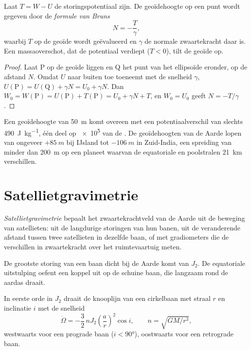\begin{proposition}\label{prop:b3:gravity-geodesy:bruns}
Laat $T = W - U$ de storingspotentiaal zijn. De geoïdehoogte op een punt wordt
gegeven door de \emph{formule van Bruns}
\[
  N = -\frac{T}{\gamma},
\]
waarbij $T$ op de geoïde wordt geëvalueerd en $\gamma$ de normale zwaartekracht daar is. Een
massaoverschot, dat de potentiaal verdiept ($T < 0$), tilt de geoïde op.
\end{proposition}

\begin{proof}
Laat P op de geoïde liggen en Q het punt van het ellipsoïde eronder, op de afstand
$N$. Omdat $U$ naar buiten toe toeneemt met de snelheid $\gamma$,
$U(\mathrm P) = U(\mathrm Q) + \gamma N = U_0 + \gamma N$. Dan
$W_0 = W(\mathrm P) = U(\mathrm P) + T(\mathrm P) = U_0 + \gamma N + T$, en
$W_0 = U_0$ geeft $N = -T/\gamma$.
\end{proof}

Een geoïdehoogte van \qty{50}{m} komt overeen met een potentiaalverschil van slechts
\qty{490}{J.kg^{-1}}, één deel op \num{e5} van de . De
geoïdehoogten van de Aarde lopen van ongeveer $+\qty{85}{m}$ bij IJsland tot
$-\qty{106}{m}$ in Zuid-India,
een spreiding van minder dan \qty{200}{m} op een planeet waarvan de equatoriale en poolstralen
\qty{21}{km} verschillen.

\section{Satellietgravimetrie}

\begin{definition}[Satellietgravimetrie]\label{def:b3:gravity-geodesy:satgrav}
\emph{Satellietgravimetrie} bepaalt het zwaartekrachtveld van de Aarde
uit de beweging van satellieten: uit de langdurige storingen
van hun banen, uit de veranderende afstand tussen twee satellieten in dezelfde
baan, of met gradiometers die de verschillen in zwaartekracht over het
ruimtevaartuig meten.
\end{definition}

De grootste storing van een baan dicht bij de Aarde komt van $J_2$. De
equatoriale uitstulping oefent een koppel uit op de schuine baan, die langzaam
rond de aardas draait.

\begin{proposition}\label{prop:b3:gravity-geodesy:nodal}
In eerste orde in $J_2$ draait de knooplijn van een cirkelbaan met straal $r$ en
inclinatie $i$ met de snelheid
\[
  \dot\Omega = -\frac32\,nJ_2\left(\frac ar\right)^2\cos i,\qquad n = \sqrt{GM/r^3} ,
\]
westwaarts voor een prograde baan ($i < \ang{90}$), oostwaarts voor een retrograde baan.
\end{proposition}

